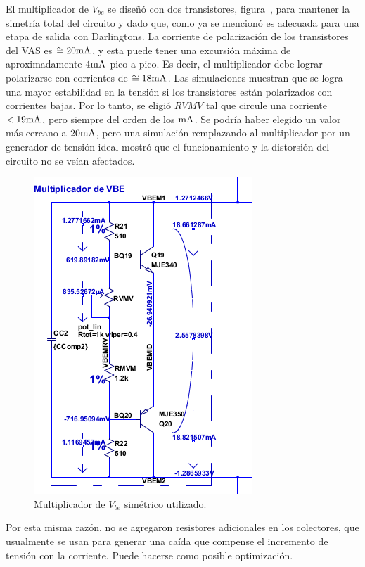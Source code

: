 El multiplicador de $V_{be}$ se diseñó con dos transistores, figura~, para mantener la simetría total del circuito y dado que, como ya se mencionó es adecuada para una etapa de salida con Darlingtons. La corriente de polarización de los transistores del VAS es $\cong 20 \si[per-mode=symbol]{\milli\ampere}$, y esta puede tener una excursión máxima de aproximadamente $4 \si[per-mode=symbol]{\milli\ampere}$ pico-a-pico. Es decir, el multiplicador debe lograr polarizarse con corrientes de $\cong 18 \si[per-mode=symbol]{\milli\ampere}$. Las simulaciones muestran que se logra una mayor estabilidad en la tensión si los transistores están polarizados con corrientes bajas. Por lo tanto, se eligió $RVMV$ tal que circule una corriente $< 19 \si[per-mode=symbol]{\milli\ampere}$, pero siempre del orden de los $\si[per-mode=symbol]{\milli\ampere}$. Se podría haber elegido un valor más cercano a $20 \si[per-mode=symbol]{\milli\ampere}$, pero una simulación remplazando al multiplicador por un generador de tensión ideal mostró que el funcionamiento y la distorsión del circuito no se veían afectados. 


\begin{figure}
  \begin{center}
   \includegraphics[height=0.5\textwidth]{img/mvbe.png}
   \caption{Multiplicador de $V_{be}$ simétrico utilizado.}
   \label{fig:mvbe}  
  \end{center}   
\end{figure}


Por esta misma razón, no se agregaron resistores adicionales en los colectores, que usualmente se usan para generar una caída que compense el incremento de tensión con la corriente. Puede hacerse como posible optimización.

